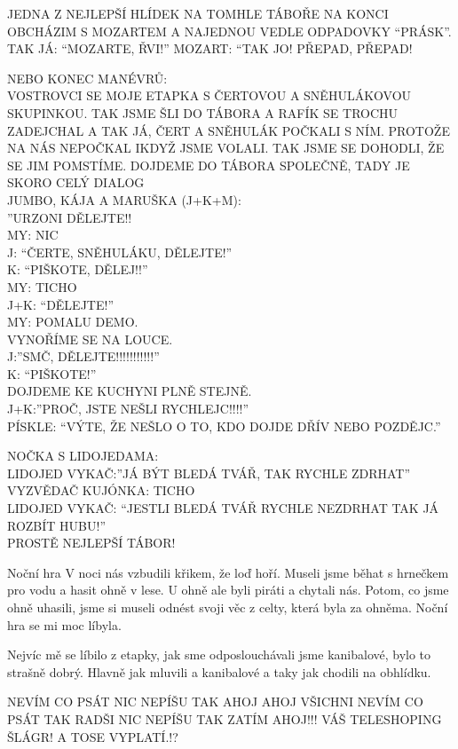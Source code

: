 \begin{multicols}{2}
JEDNA Z NEJLEPŠÍ HLÍDEK  NA TOMHLE TÁBOŘE
NA KONCI OBCHÁZIM S MOZARTEM A NAJEDNOU VEDLE ODPADOVKY “PRÁSK”. TAK JÁ: “MOZARTE, ŘVI!” MOZART: “TAK JO! PŘEPAD, PŘEPAD!

NEBO KONEC MANÉVRŮ:\\
VOSTROVCI SE MOJE ETAPKA S ČERTOVOU A SNĚHULÁKOVOU SKUPINKOU. TAK JSME ŠLI DO TÁBORA A RAFÍK SE TROCHU ZADEJCHAL A TAK JÁ, ČERT A SNĚHULÁK POČKALI S NÍM. PROTOŽE NA NÁS NEPOČKAL IKDYŽ JSME VOLALI. TAK JSME SE DOHODLI, ŽE SE JIM POMSTÍME. DOJDEME DO TÁBORA SPOLEČNĚ, TADY JE SKORO CELÝ DIALOG\\
JUMBO, KÁJA A MARUŠKA (J+K+M):\\
”URZONI DĚLEJTE!!\\
MY: NIC\\
J: “ČERTE, SNĚHULÁKU, DĚLEJTE!”\\
K: “PIŠKOTE, DĚLEJ!!”\\
MY: TICHO\\
J+K: “DĚLEJTE!”\\
MY: POMALU DEMO.\\
VYNOŘÍME SE NA LOUCE.\\
J:”SMČ, DĚLEJTE!!!!!!!!!!!”\\
K: “PIŠKOTE!”\\
DOJDEME KE KUCHYNI PLNĚ STEJNĚ.\\
J+K:”PROČ, JSTE NEŠLI RYCHLEJC!!!!”\\
PÍSKLE: “VÝTE, ŽE NEŠLO O TO, KDO DOJDE DŘÍV NEBO POZDĚJC.”

NOČKA S LIDOJEDAMA:\\
LIDOJED VYKAČ:”JÁ BÝT BLEDÁ TVÁŘ, TAK RYCHLE ZDRHAT”\\
VYZVĚDAČ KUJÓNKA: TICHO\\
LIDOJED VYKAČ: “JESTLI BLEDÁ TVÁŘ RYCHLE NEZDRHAT TAK JÁ ROZBÍT HUBU!”\\
PROSTĚ NEJLEPŠÍ TÁBOR!\\



Noční hra
V noci nás vzbudili křikem, že loď hoří. Museli jsme běhat s hrnečkem pro vodu a hasit ohně v lese. U ohně ale byli piráti a chytali nás. Potom, co jsme ohně uhasili, jsme si museli odnést svoji věc z celty, která byla za ohněma. Noční hra se mi moc líbyla.




Nejvíc mě se líbilo z etapky, jak sme odposlouchávali jsme kanibalové, bylo to strašně dobrý. Hlavně jak mluvili a kanibalové a taky jak chodili na obhlídku.




NEVÍM CO PSÁT NIC NEPÍŠU TAK AHOJ
AHOJ VŠICHNI NEVÍM CO PSÁT TAK RADŠI NIC NEPÍŠU TAK ZATÍM AHOJ!!! VÁŠ TELESHOPING ŠLÁGR! A TOSE VYPLATÍ.!?

\end{multicols}


\clearpage

